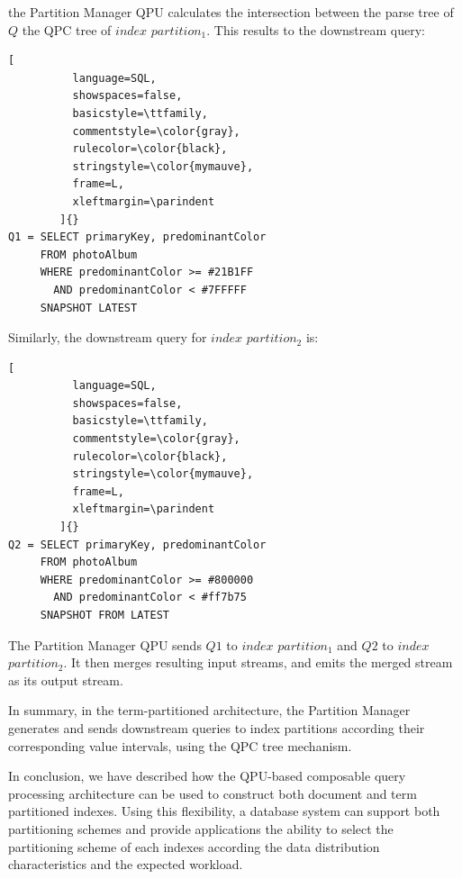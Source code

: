 \noindent
the Partition Manager QPU calculates the intersection between the parse tree of $Q$ the QPC tree of $index$ $partition_1$.
This results to the downstream query:

\begin{lstlisting}[
          language=SQL,
          showspaces=false,
          basicstyle=\ttfamily,
          commentstyle=\color{gray},
          rulecolor=\color{black},
          stringstyle=\color{mymauve},
          frame=L,
          xleftmargin=\parindent
        ]{}
Q1 = SELECT primaryKey, predominantColor
     FROM photoAlbum
     WHERE predominantColor >= #21B1FF
       AND predominantColor < #7FFFFF
     SNAPSHOT LATEST
\end{lstlisting}

\noindent
Similarly, the downstream query for $index$ $partition_2$ is:

\begin{lstlisting}[
          language=SQL,
          showspaces=false,
          basicstyle=\ttfamily,
          commentstyle=\color{gray},
          rulecolor=\color{black},
          stringstyle=\color{mymauve},
          frame=L,
          xleftmargin=\parindent
        ]{}
Q2 = SELECT primaryKey, predominantColor
     FROM photoAlbum
     WHERE predominantColor >= #800000
       AND predominantColor < #ff7b75
     SNAPSHOT FROM LATEST
\end{lstlisting}

\noindent
The Partition Manager QPU sends $Q1$ to $index$ $partition_1$ and $Q2$ to $index$ $partition_2$.
It then merges resulting input streams, and emits the merged stream as its output stream.

In summary, in the term-partitioned architecture,
the Partition Manager generates and sends downstream queries to index partitions according their corresponding
value intervals, using the QPC tree mechanism.

\bigskip
\noindent
In conclusion, we have described how the QPU-based composable query processing architecture can be used to construct both
document and term partitioned indexes.
Using this flexibility, a database system can support both partitioning schemes and provide applications the ability to
select the partitioning scheme of each indexes according the data distribution characteristics and the expected workload.

